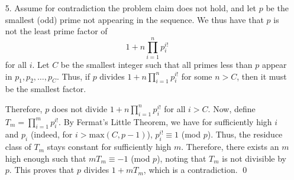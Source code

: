 \documentclass[a4paper, 12pt]{article}
\begin{document}
\begin{enumerate}
\item[5.]  Assume for contradiction the problem claim does not hold, and let $p$ be the smallest (odd) prime not appearing in the sequence. We thus have that $p$ is not the least prime factor of 
$$1 + n \prod_{i=1}^n p_i^{i!}$$
for all $i$. Let $C$ be the smallest integer such that all primes less than $p$ appear in $p_1, p_2, \dots, p_C$. Thus, if $p$ divides $1 + n \prod_{i=1}^n p_i^{i!}$ for some $n > C$, then it must be the smallest factor.

Therefore, $p$ does not divide $1 + n \prod_{i=1}^n p_i^{i!}$ for all $i > C$. Now, define $T_m = \prod_{i=1}^m p_i^{i!}$. By Fermat's Little Theorem, we have for sufficiently high $i$ and $p_i$ (indeed, for $i > \textrm{max}(C, p-1)$), $p_i^{i!} \equiv 1$ (mod $p$). Thus, the residuce class of $T_m$ stays constant for sufficiently high $m$. Therefore, there exists an $m$ high enough such that $m T_m \equiv -1$ (mod $p$), noting that $T_m$ is not divisible by $p$. This proves that $p$ divides $1 + m T_m$, which is a contradiction. \qed


    

\end{enumerate}
\end{document}
